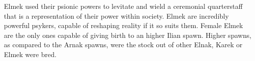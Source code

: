 Elmek used their psionic powers to levitate and wield a ceremonial
quarterstaff that is a representation of their power within society. Elmek are
incredibly powerful psykers, capable of reshaping reality if it so suits
them. Female Elmek are the only ones capable of giving birth to an higher
Ilian spawn. Higher spawns, as compared to the Arnak spawns, were the stock
out of other Elnak, Karek or Elmek were bred.
